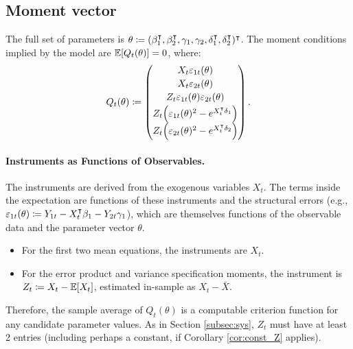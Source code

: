 \subsection{Moment vector}

The full set of parameters is $\theta\coloneqq(\beta_{1}^{\intercal},\beta_{2}^{\intercal},\gamma_{1},\gamma_{2},\delta_{1}^{\intercal},\delta_{2}^{\intercal})^{\intercal}$.
The moment conditions implied by the model are $\mathbb{E}[Q_{t}(\theta)]=0$,
where:
\[
Q_{t}(\theta)\coloneqq\begin{pmatrix}X_{t}\varepsilon_{1t}(\theta)\\[2pt]
X_{t}\varepsilon_{2t}(\theta)\\[2pt]
Z_{t}\varepsilon_{1t}(\theta)\varepsilon_{2t}(\theta)\\[2pt]
Z_{t}\!\left(\varepsilon_{1t}(\theta)^{2}-e^{X_{t}^{\intercal}\delta_{1}}\right)\\[2pt]
Z_{t}\!\left(\varepsilon_{2t}(\theta)^{2}-e^{X_{t}^{\intercal}\delta_{2}}\right)
\end{pmatrix}.
\]


\paragraph{Instruments as Functions of Observables.}

The instruments are derived from the exogenous variables $X_{t}$.
The terms inside the expectation are functions of these instruments
and the structural errors (e.g., $\varepsilon_{1t}(\theta)\coloneqq Y_{1t}-X_{t}^{\intercal}\beta_{1}-Y_{2t}\gamma_{1}$),
which are themselves functions of the observable data and the parameter
vector $\theta$.
\begin{itemize}
\item For the first two mean equations, the instruments are $X_{t}$.
\item For the error product and variance specification moments, the instrument
is $Z_{t}\coloneqq X_{t}-\mathbb{E}[X_{t}]$, estimated in-sample as $X_{t}-\bar{X}$.
\end{itemize}
Therefore, the sample average of $Q_{t}(\theta)$ is a computable
criterion function for any candidate parameter values. As in Section \ref{subsec:sys}, $Z_t$
must have at least 2 entries (including perhaps a constant, if Corollary \ref{cor:const_Z} applies).

